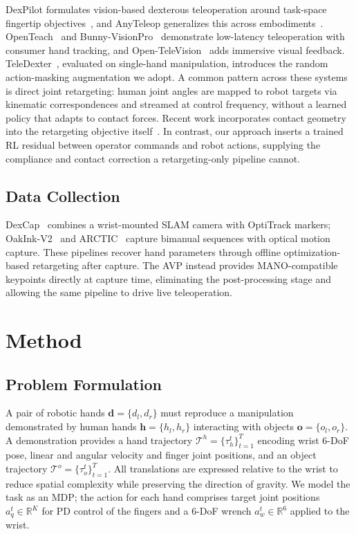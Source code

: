 \documentclass[letterpaper, 10 pt, conference]{ieeeconf}
\begin{document}
DexPilot formulates vision-based dexterous teleoperation around task-space fingertip
objectives~\cite{dexpilot}, and AnyTeleop generalizes this across
embodiments~\cite{anyteleop}. OpenTeach~\cite{openteach} and
Bunny-VisionPro~\cite{bunnyvisionpro} demonstrate low-latency teleoperation with
consumer hand tracking, and Open-TeleVision~\cite{opentv} adds immersive visual
feedback. TeleDexter~\cite{teledexter}, evaluated on single-hand manipulation,
introduces the random action-masking augmentation we adopt. A common pattern across
these systems is direct joint retargeting: human joint angles are mapped to robot
targets via kinematic correspondences and streamed at control frequency, without a
learned policy that adapts to contact forces. Recent work incorporates contact geometry
into the retargeting objective itself~\cite{toporetarget}. In contrast, our approach
inserts a trained RL residual between operator commands and robot actions, supplying
the compliance and contact correction a retargeting-only pipeline cannot.

\subsection{Data Collection}

DexCap~\cite{dexcap} combines a wrist-mounted SLAM camera with OptiTrack markers;
OakInk-V2~\cite{oakinkv2} and ARCTIC~\cite{arctic} capture bimanual sequences with
optical motion capture. These pipelines recover hand parameters through offline
optimization-based retargeting after capture. The AVP instead provides
MANO-compatible~\cite{mano} keypoints directly at capture time, eliminating the
post-processing stage and allowing the same pipeline to drive live teleoperation.

\section{Method}

\subsection{Problem Formulation}

A pair of robotic hands $\mathbf{d} = \{d_l, d_r\}$ must reproduce a manipulation
demonstrated by human hands $\mathbf{h} = \{h_l, h_r\}$ interacting with objects
$\mathbf{o} = \{o_l, o_r\}$. A demonstration provides a hand trajectory
$\mathcal{T}^h = \{\tau^t_h\}_{t=1}^{T}$ encoding wrist 6-DoF pose, linear and angular
velocity and finger joint positions, and an object trajectory
$\mathcal{T}^o = \{\tau^t_o\}_{t=1}^{T}$. All translations are expressed relative to the
wrist to reduce spatial complexity while preserving the direction of gravity. We model
the task as an MDP; the action for each hand comprises target joint positions
$a^t_q \in \mathbb{R}^K$ for PD control of the fingers and a 6-DoF wrench
$a^t_w \in \mathbb{R}^6$ applied to the wrist.
\end{document}

